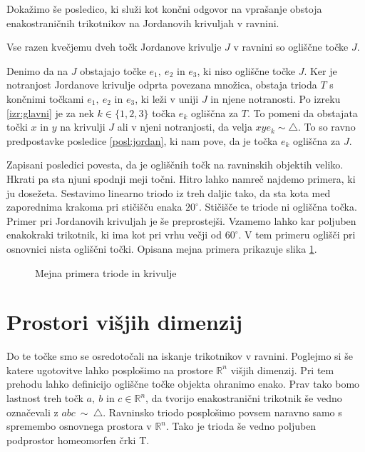 \documentclass[mat1]{fmfdelo}
\newcommand{\R}{\mathbb R}
\begin{document}
Dokažimo še posledico, ki služi kot končni odgovor na vprašanje obstoja enakostraničnih trikotnikov na Jordanovih krivuljah v ravnini.
\begin{posledica}
Vse razen kvečjemu dveh točk Jordanove krivulje $J$ v ravnini so ogliščne točke $J$.
\end{posledica}
\proof
Denimo da na $J$ obstajajo točke $e_1,\ e_2$ in $e_3$, ki niso ogliščne točke $J$. Ker je notranjost Jordanove krivulje odprta povezana množica, obstaja trioda $T$ s končnimi točkami $e_1,\ e_2$ in $e_3$, ki leži v uniji $J$ in njene notranosti. Po izreku \ref{izr:glavni} je za nek $k \in \{1, 2, 3\}$ točka $e_k$ ogliščna za $T$. To pomeni da obstajata točki $x$ in $y$ na krivulji $J$ ali v njeni notranjosti, da velja $xye_k \sim \triangle$. To so ravno predpostavke posledice \ref{posl:jordan}, ki nam pove, da je točka $e_k$ ogliščna za $J$.
\endproof

Zapisani posledici povesta, da je ogliščnih točk na ravninskih objektih veliko. Hkrati pa sta njuni spodnji meji točni. Hitro lahko namreč najdemo primera, ki ju dosežeta. Sestavimo linearno triodo iz treh daljic tako, da sta kota med zaporednima krakoma pri stičišču enaka $20^\circ$. Stičišče te triode ni ogliščna točka. Primer pri Jordanovih krivuljah je še preprostejši. Vzamemo lahko kar poljuben enakokraki trikotnik, ki ima kot pri vrhu večji od $60^\circ$. V tem primeru oglišči pri osnovnici nista ogliščni točki. Opisana mejna primera prikazuje slika \ref{fig:mejna_primera}.

\begin{figure}[h!]
\centering
{}
\caption{Mejna primera triode in krivulje}
\label{fig:mejna_primera}
\end{figure}

\section{Prostori višjih dimenzij}
Do te točke smo se osredotočali na iskanje trikotnikov v ravnini. Poglejmo si še katere ugotovitve lahko posplošimo na prostore $\R^n$ višjih dimenzij. Pri tem prehodu lahko definicijo ogliščne točke objekta ohranimo enako. Prav tako bomo lastnost treh točk $a,\ b$ in $c \in \R^n$, da tvorijo enakostranični trikotnik še vedno označevali z $abc~\sim~\triangle$. Ravninsko triodo posplošimo povsem naravno samo s spremembo osnovnega prostora v $\R^n$. Tako je trioda še vedno poljuben podprostor homeomorfen črki T. 
\end{document}
